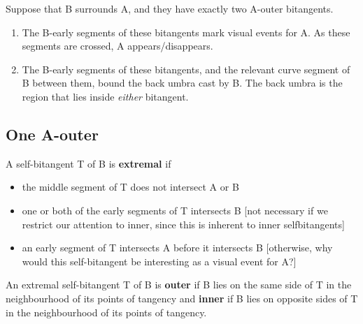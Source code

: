 \documentclass[12pt]{article}
\newif\ifCommentary             %
\begin{document}
\begin{lemma}
Suppose that B surrounds A, and they have exactly two A-outer bitangents.
\begin{enumerate}
\item %
      The B-early segments of these bitangents mark visual events for A.
      As these segments are crossed, A appears/disappears.
\item 
\label{lem:localbackumbrasurrounding}
      The B-early segments of these bitangents,
      and the relevant curve segment of B between them,
      bound the back umbra cast by B.
      The back umbra is the region that lies inside {\em either} bitangent.
      \ifCommentary (yielding a much larger umbra than Lemma~\ref{lem:localbackumbra}) \fi
      \ifCommentary(Figure~\ref{fig:backsurrounding}c).\fi
\end{enumerate}
\end{lemma}

\ifCommentary
\begin{figure}[h]
\begin{center}
\texttt{[image: img2/vg10.jpg]}
\texttt{[image: img2/vg10outer.jpg]}
\texttt{[image: img2/vg10back.jpg]}
\end{center}
\caption{Defining the back umbra of A when A surrounds L. (a) A surrounds L. (b) The two L-outer bitangents of A and L. (c) The back umbra of A.}
\label{fig:backsurrounding}
\end{figure}
\fi

\clearpage

\subsection{One A-outer}

\begin{defn2}
A self-bitangent T of B is {\bf extremal} if 
\begin{itemize}
\item the middle segment of T does not intersect A or B
\item one or both of the early segments of T intersects B [not necessary if we restrict
      our attention to inner, since this is inherent to inner selfbitangents]
\item an early segment of T intersects A before it intersects B
      [otherwise, why would this self-bitangent be interesting as a visual event for A?]
\end{itemize}
An extremal self-bitangent T of B is {\bf outer} if B lies on the same side of T
in the neighbourhood of its points of tangency and {\bf inner} if 
B lies on opposite sides of T in the neighbourhood of its points of tangency.
\end{defn2}
\end{document}
